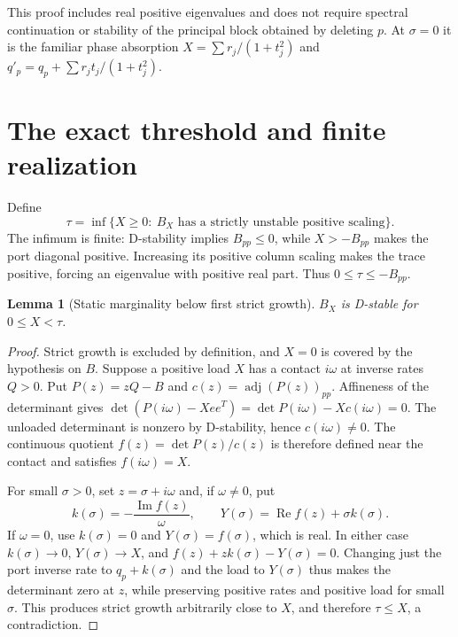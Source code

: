 \documentclass[11pt]{article}
\newtheorem{lemma}[theorem]{Lemma}
\theoremstyle{remark}\newtheorem{remark}[theorem]{Remark}
\newcommand{\Rea}{\operatorname{Re}}\newcommand{\Ima}{\operatorname{Im}}
\begin{document}
This proof includes real positive eigenvalues and does not require spectral
continuation or stability of the principal block obtained by deleting $p$.
At $\sigma=0$ it is the familiar phase absorption
$X=\sum r_j/(1+t_j^2)$ and $q'_p=q_p+\sum r_jt_j/(1+t_j^2)$.

\section{The exact threshold and finite realization}
Define
\begin{equation}\label{eq:tau}
 \tau=\inf\{X\ge0:\ B_X\text{ has a strictly unstable positive scaling}\}.
\end{equation}
The infimum is finite: D-stability implies $B_{pp}\le0$, while
$X>-B_{pp}$ makes the port diagonal positive. Increasing its positive
column scaling makes the trace positive, forcing an eigenvalue with
positive real part. Thus $0\le\tau\le-B_{pp}$.

\begin{lemma}[Static marginality below first strict growth]\label{lem:marginal}
$B_X$ is D-stable for $0\le X<\tau$.
\end{lemma}
\begin{proof}
Strict growth is excluded by definition, and $X=0$ is covered by the
hypothesis on $B$. Suppose a positive load $X$ has a contact $i\omega$
at inverse rates $Q>0$. Put $P(z)=zQ-B$ and
$c(z)=\operatorname{adj}(P(z))_{pp}$. Affineness of the determinant gives
$\det(P(i\omega)-Xee^T)=\det P(i\omega)-Xc(i\omega)=0$.
The unloaded determinant is nonzero by D-stability, hence $c(i\omega)\ne0$.
The continuous quotient $f(z)=\det P(z)/c(z)$ is therefore defined near
the contact and satisfies $f(i\omega)=X$.

For small $\sigma>0$, set $z=\sigma+i\omega$ and, if $\omega\ne0$, put
\[
 k(\sigma)=-\frac{\Ima f(z)}{\omega},\qquad
 Y(\sigma)=\Rea f(z)+\sigma k(\sigma).
\]
If $\omega=0$, use $k(\sigma)=0$ and $Y(\sigma)=f(\sigma)$, which is real.
In either case $k(\sigma)\to0$, $Y(\sigma)\to X$, and
$f(z)+zk(\sigma)-Y(\sigma)=0$. Changing just the port inverse rate to
$q_p+k(\sigma)$ and the load to $Y(\sigma)$ thus makes the determinant
zero at $z$, while preserving positive rates and positive load for small
$\sigma$. This produces strict growth arbitrarily close to $X$, and
therefore $\tau\le X$, a contradiction.
\end{proof}
\end{document}
